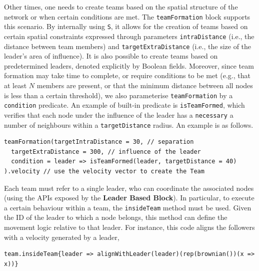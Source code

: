 Other times, one needs to create teams based on the spatial structure of the network or when certain conditions are met. 
%
The \lstinline|teamFormation| block supports this scenario. %
By internally using \lstinline|S|, it allows for the creation of teams based on certain spatial constraints expressed through parameters \lstinline|intraDistance| (i.e., the distance between team members) and
 \lstinline|targetExtraDistance| (i.e., the size of the leader's area of influence). 
%
It is also possible to create teams based on predetermined leaders, denoted explicitly by Boolean fields. %
%
Moreover, since team formation may take time to complete, or require conditions to be met (e.g., that at least $N$ members are present, or that the minimum distance between all nodes is less than a certain threshold),
 we also parameterise \lstinline|teamFormation| by a \lstinline|condition| predicate. 
%
An example of built-in predicate is \lstinline|isTeamFormed|, which verifies that each node under 
 the influence of the leader has a \lstinline|necessary| a number of neighbours
 within a \lstinline|targetDistance| radius.
%
An example is as follows.
\begin{lstlisting}
teamFormation(targetIntraDistance = 30, // separation
  targetExtraDistance = 300, // influence of the leader
  condition = leader => isTeamFormed(leader, targetDistance = 40)
).velocity // use the velocity vector to create the Team
\end{lstlisting}
Each team must refer to a single leader, 
 who can coordinate the associated nodes 
 (using the APIs exposed by the \textbf{Leader Based Block}). 
In particular, to execute a certain behaviour within a team, 
 the \lstinline|insideTeam| method must be used. 
 Given the ID of the leader to which a node belongs, 
 this method can define the movement logic relative to that leader.
%
For instance, this code aligns the followers with a velocity generated by a leader, 
\begin{lstlisting}[xrightmargin=-3.4pt]
team.insideTeam{leader => alignWithLeader(leader)(rep(brownian())(x => x))}
\end{lstlisting}

